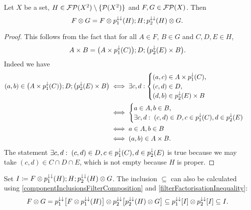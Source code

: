 \begin{lemma} \label{filterCompositionFactorisationLemma}
Let $X$ be a set, $H\in \operatorname{\mathcal{FP}}(X^2)\setminus \{\operatorname{\mathcal{P}}(X^2)\}$ and $F,G\in\operatorname{\mathcal{FP}}(X)$. Then
\[ F\otimes G = F\otimes p_1^{\downarrow\downarrow}(H); H; p_2^{\downarrow\downarrow}(H)\otimes G. \]
\end{lemma}
\begin{proof}
This follows from the fact that for all $A\in F$, $B\in G$ and $C,D,E\in H$,
\[ A\times B = \big(A \times p_1^{\downarrow}(C)\big);D;\big(p_2^\downarrow(E)\times B\big). \]
Indeed we have
\begin{align*}
(a,b)\in \big(A \times p_1^{\downarrow}(C)\big);D;\big(p_2^\downarrow(E)\times B\big) &\iff \exists c,d: \begin{cases}
(a,c)\in A\times p_1^\downarrow(C),\\ (c,d)\in D,\\ (d,b)\in p_2^\downarrow(E)\times B
\end{cases} \\
&\iff \begin{cases}
a\in A, b\in B, \\
\exists c,d: \; (c,d)\in D, c\in p_1^\downarrow(C), d\in p_2^\downarrow(E)
\end{cases} \\
&\iff a\in A, b\in B \\
&\iff (a,b)\in A\times B.
\end{align*}
The statement $\exists c,d: \; (c,d)\in D, c\in p_1^\downarrow(C), d\in p_2^\downarrow(E)$ is true because we may take $(c,d)\in C\cap D\cap E$, which is not empty because $H$ is proper.
\end{proof}
Set $I\coloneqq F\otimes p_1^{\downarrow\downarrow}(H); H; p_2^{\downarrow\downarrow}(H)\otimes G$. The inclusion $\subseteq$ can also be calculated using \ref{componentInclusionsFilterComposition} and \ref{filterFactorisationInequality}:
\[ F\otimes G = p_1^{\downarrow\downarrow}\big[F\otimes p_1^{\downarrow\downarrow}(H)\big] \otimes p_2^{\downarrow\downarrow}\big[p_2^{\downarrow\downarrow}(H)\otimes G\big] \subseteq p_1^{\downarrow\downarrow}[I]\otimes p_2^{\downarrow\downarrow}[I] \subseteq I. \]


